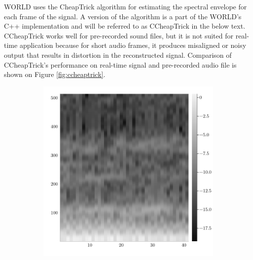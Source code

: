 \documentclass[a4paper]{article}
\begin{document}
WORLD uses the CheapTrick algorithm for estimating the spectral envelope for each frame of the signal. A version of the algorithm is a part of the WORLD's C++ implementation and will be referred to as CCheapTrick in the below text. CCheapTrick works well for pre-recorded sound files, but it is not suited for real-time application because for short audio frames, it produces misaligned or noisy output that results in distortion in the reconstructed signal. Comparison of CCheapTrick's performance on real-time signal and pre-recorded audio file is shown on Figure \ref{fig:ccheaptrick}.

\begin{figure}
    \begin{subfigure}[b]{0.5\textwidth}
        \centering
        \includegraphics{graphics/realtime_ccheaptrick.png}
        \caption{}
        \label{fig:realtime_ccheaptrick}
    \end{subfigure}
    \begin{subfigure}[b]{0.5\textwidth}
        \centering

\end{subfigure}
\end{figure}
\end{document}
